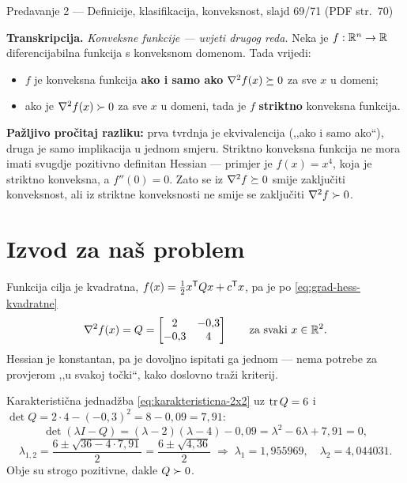 \begin{izvor}{Predavanje 2 --- Definicije, klasifikacija, konveksnost, slajd 69/71 (PDF str.~70)}

\textbf{Transkripcija.} \emph{Konveksne funkcije --- uvjeti drugog reda.} Neka je
$f: \mathbb{R}^n \to \mathbb{R}$ diferencijabilna funkcija s konveksnom domenom. Tada vrijedi:
\begin{itemize}[nosep,leftmargin=*]
  \item $f$ je konveksna funkcija \textbf{ako i samo ako} $\nabla^2 f(x) \succeq 0$
        za sve $x$ u domeni;
  \item ako je $\nabla^2 f(x) \succ 0$ za sve $x$ u domeni, tada je $f$
        \textbf{striktno} konveksna funkcija.
\end{itemize}

\textbf{Pažljivo pročitaj razliku:} prva tvrdnja je ekvivalencija (,,ako i samo
ako``), druga je samo implikacija u jednom smjeru. Striktno konveksna funkcija ne
mora imati svugdje pozitivno definitan Hessian --- primjer je $f(x) = x^4$, koja
je striktno konveksna, a $f''(0) = 0$. Zato se iz $\nabla^2 f \succeq 0$ smije
zaključiti konveksnost, ali iz striktne konveksnosti ne smije se zaključiti
$\nabla^2 f \succ 0$.
\end{izvor}

\section{Izvod za naš problem}
\label{sec:z1a-izvod}

\begin{korak}
Funkcija cilja je kvadratna, $f(x) = \tfrac12 x^{\mathsf{T}} Q x + c^{\mathsf{T}} x$, pa je po
\eqref{eq:grad-hess-kvadratne}
\begin{equation}
\nabla^2 f(x) = Q = \begin{bmatrix} 2 & -0{,}3 \\ -0{,}3 & 4 \end{bmatrix}
\qquad \text{za svaki } x \in \mathbb{R}^2 .
\end{equation}
Hessian je konstantan, pa je dovoljno ispitati ga jednom --- nema potrebe za
provjerom ,,u svakoj točki``, kako doslovno traži kriterij.
\end{korak}

\begin{korak}
Karakteristična jednadžba \eqref{eq:karakteristicna-2x2} uz
$\operatorname{tr} Q = 6$ i $\det Q = 2\cdot4 - (-0{,}3)^2 = 8 - 0{,}09 = 7{,}91$:
\begin{equation}
\det(\lambda I - Q) = (\lambda - 2)(\lambda - 4) - 0{,}09
= \lambda^2 - 6\lambda + 7{,}91 = 0,
\end{equation}
\begin{equation}
\lambda_{1,2} = \frac{6 \pm \sqrt{36 - 4\cdot 7{,}91}}{2}
             = \frac{6 \pm \sqrt{4{,}36}}{2}
\;\Longrightarrow\;
\lambda_1 = 1{,}955969, \quad \lambda_2 = 4{,}044031 .
\end{equation}
Obje su strogo pozitivne, dakle $Q \succ 0$.
\end{korak}

